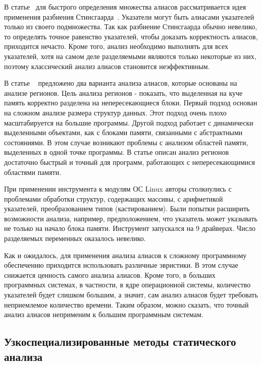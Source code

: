 В статье~\cite{Kahlon:2009:SDR} для быстрого определения множества алиасов рассматривается идея применения разбиения Стинсгаарда~\cite{Steensgaard:1996}. 
Указатели могут быть алиасами указателей только из своего подмножества.
Так как разбиение Стинсгаарда обычно невелико, то определять точное равенство указателей, чтобы доказать корректность алиасов, приходится нечасто.
Кроме того, анализ необходимо выполнять для всех указателей, хотя на самом деле разделяемыми являются только некоторые из них, поэтому классический анализ алиасов становится неэффективным.

В статье ~\cite{Seidl:2009} предложено два варианта анализа алиасов, которые основаны на анализе регионов.
Цель анализа регионов - показать, что выделенная на куче память корректно разделена на непересекающиеся блоки.
Первый подход основан на сложном анализе размера структур данных. Этот подход очень плохо масштабируется на большие программы.
Другой подход работает с динамически выделенными объектами, как с блоками памяти, связанными с абстрактными состояниями.
В этом случае возникают проблемы с анализом областей памяти, выделенных в одной точке программы.
В статье описан анализ регионов достаточно быстрый и точный для программ, работающих с непересекающимися областями памяти.

При применении инструмента к модулям ОС Linux авторы столкнулись с проблемами обработки структур, содержащих массивы, с арифметикой указателей, преобразованием типов (кастированием).
Были попытки расширить возможности анализа, например, предположением, что указатель может указывать не только на начало блока памяти. 
Инструмент запускался на 9 драйверах. Число разделяемых переменных оказалось невелико.

Как и ожидалось, для применения анализа алиасов к сложному программному обеспечению приходится использовать различные эвристики.
В этом случае снижается ценность самого анализа алиасов.
Кроме того, в больших программных системах, в частности, в ядре операционной системы, количество указателей будет слишком большим, а значит, сам анализ алиасов будет требовать неприемлемое количество времени.
Таким образом, можно сказать, что точный анализ алиасов неприменим к большим программным системам.


\subsection{Узкоспециализированные методы статического анализа}

